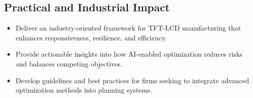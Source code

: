 \documentclass[12pt,a4paper]{article}
\begin{document}
\subsection{Practical and Industrial Impact}

\begin{itemize}[leftmargin=*]
    \item Deliver an industry-oriented framework for TFT-LCD manufacturing that enhances responsiveness, resilience, and efficiency.
    
    \item Provide actionable insights into how AI-enabled optimization reduces risks and balances competing objectives.
    
    \item Develop guidelines and best practices for firms seeking to integrate advanced optimization methods into planning systems.
\end{itemize}
\end{document}
